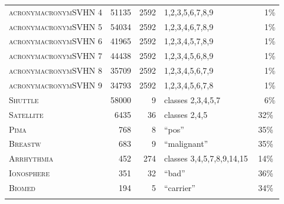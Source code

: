 \begin{table}[p]
\begin{center}
\begin{tabular}{lrrlc}
		\textsc{acronym{acronym{SVHN}} 4}	& \num{51135}	& \num{2592} & 1,2,3,5,6,7,8,9 & ~~1\%\\
		\textsc{acronym{acronym{SVHN}} 5}	& \num{54034}	& \num{2592} & 1,2,3,4,6,7,8,9 & ~~1\%\\
		\textsc{acronym{acronym{SVHN}} 6}	& \num{41965}	& \num{2592} & 1,2,3,4,5,7,8,9 & ~~1\%\\
		\textsc{acronym{acronym{SVHN}} 7}	& \num{44438}	& \num{2592} & 1,2,3,4,5,6,8,9 & ~~1\%\\
		\textsc{acronym{acronym{SVHN}} 8}	& \num{35709}	& \num{2592} & 1,2,3,4,5,6,7,9 & ~~1\%\\
		\textsc{acronym{acronym{SVHN}} 9}	& \num{34793}	& \num{2592	} & 1,2,3,4,5,6,7,8 & ~~1\%\\
		\textsc{Shuttle} & \num{58000} & \num{9} & classes 2,3,4,5,7 & ~~6\%\\		
		\textsc{Satellite} & \num{6435} & \num{36} & classes 2,4,5 & 32\%\\		
		\textsc{Pima} & \num{768} & \num{8} & \enquote{pos} & 35\%\\
		\textsc{Breastw} & \num{683} & \num{9} & \enquote{malignant} & 35\%\\
		\textsc{Arrhythmia} & \num{452} & \num{274} & classes 3,4,5,7,8,9,14,15 & 14\%\\
		\textsc{Ionosphere} & \num{351} & \num{32} & \enquote{bad} & 36\%\\
		\textsc{Biomed} & \num{194} & \num{5} & \enquote{carrier} & 34\%\\
		\addlinespace
		\bottomrule 
	\end{tabular}
\end{center}
\label{tbl:batch_datasets}
\end{table}
\fi